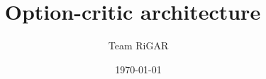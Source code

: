 \title{Option-critic architecture~\cite{bacon2017option}}
\author{Team RiGAR}
\date{\today}

\makeatletter
\def\maketitle{
    \begin{center}
        {\LARGE \bfseries \@title~\\[1ex]}
        {\large \@author~\\[1ex]}
        {\@date}
    \end{center}
}
\makeatother
\maketitle
